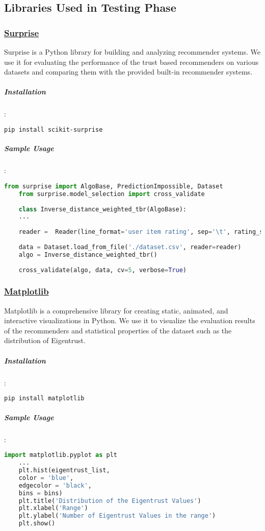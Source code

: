 \subsection{Libraries Used in Testing Phase}
	\subsubsection{\href{http://surpriselib.com/}{Surprise}} 
	Surprise is a Python library for building and analyzing recommender systems. We use it for evaluating the performance of the trust based recommenders on various datasets and comparing them with the provided built-in recommender systems.
	\label{surprise}
	\subparagraph{Installation}:
	\begin{lstlisting}[language=bash]
	pip install scikit-surprise
	\end{lstlisting}
	
	\subparagraph{Sample Usage}:
	\begin{lstlisting}[language=python, caption=Surprise example]
	from surprise import AlgoBase, PredictionImpossible, Dataset
	from surprise.model_selection import cross_validate
	
	class Inverse_distance_weighted_tbr(AlgoBase):
	...
	
	reader =  Reader(line_format='user item rating', sep='\t', rating_scale=(1, 5))
	
	data = Dataset.load_from_file('./dataset.csv', reader=reader)
	algo = Inverse_distance_weighted_tbr()
	
	cross_validate(algo, data, cv=5, verbose=True)
	\end{lstlisting}
	
	\subsubsection{\href{https://matplotlib.org/}{Matplotlib}}
	Matplotlib is a comprehensive library for creating static, animated, and interactive visualizations in Python. We use it to visualize the evaluation results of the recommenders and  statistical properties of the dataset such as the distribution of Eigentrust.
	\subparagraph{Installation}:
	\begin{lstlisting}[language=bash]
	pip install matplotlib
	\end{lstlisting}
	
	\subparagraph{Sample Usage}:
	\begin{lstlisting}[language=python, caption=Matplotlib example]
	import matplotlib.pyplot as plt
	...
	plt.hist(eigentrust_list, 
	color = 'blue', 
	edgecolor = 'black',
	bins = bins)
	plt.title('Distribution of the Eigentrust Values')
	plt.xlabel('Range')
	plt.ylabel('Number of Eigentrust Values in the range')
	plt.show() 
	\end{lstlisting}